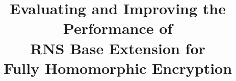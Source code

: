 \documentclass{sig-alternate}
\begin{document}
\title{Evaluating and Improving the Performance of\\RNS Base Extension for\\Fully Homomorphic Encryption}

\date{}
\maketitle

\thispagestyle{firstpage}
\pagestyle{plain}

\begin{abstract}
    
\end{abstract}











\end{document}
